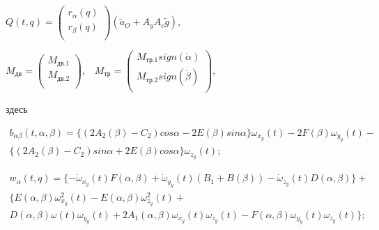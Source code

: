 \(
Q(t,q)=
\left( 
\begin{matrix}
r_{\alpha} (q) \\
r_{\beta} (q) \\
\end{matrix}
\right)
(\tilde{a}_O + A_y A_c \tilde{g})
\),

\( M_{\textit{дв}}= \left( \begin{matrix}
M_{\textit{дв.1}}\\
M_{\textit{дв.2}}\\
\end{matrix}
\right) \),\ \ \( M_{\textit{тр}}= \left( \begin{matrix}
M_{\textit{тр.1}}sign \left( \dot \alpha \right) \\
M_{\textit{тр.2}}sign \left( \dot \beta \right) \\
\end{matrix}
\right) \), 

здесь 

\begin{equation}
\label{eq:p3:48+1}
\begin{multlined}
b_{ \alpha \beta } \left( t, \alpha, \beta \right) = \lbrace \left( 2A_{2} \left( \beta \right) -C_{2} \right) cos \alpha -2E \left( \beta \right) sin \alpha \rbrace \omega _{x_{y}} \left( t \right) -2F \left( \beta \right) \omega _{y_{y}} \left( t \right) - \\ 
\lbrace \left( 2A_{2} \left( \beta \right) -C_{2} \right) sin \alpha +2E \left( \beta \right) cos \alpha \rbrace \omega _{z_{y}} \left( t \right) ;
\end{multlined}
\end{equation}

\begin{equation}
\label{eq:p3:48+2}
\begin{multlined}
w_{ \alpha } ( t,q ) = 
\lbrace - \dot \omega _{x_{y}} ( t ) F ( \alpha, \beta ) + 
\dot \omega _{y_{y}} ( t ) ( B_{1}+B ( \beta ) ) - 
\dot \omega _{z_{y}} ( t ) D ( \alpha, \beta ) \rbrace +\\
\lbrace E ( \alpha, \beta ) \omega _{x_{y}}^{2} ( t ) -E ( \alpha, \beta ) \omega _{z_{y}}^{2} ( t ) +\\
D ( \alpha, \beta ) \omega ( t ) \omega _{y_{y}} ( t ) +2A_{1} ( \alpha, \beta ) \omega _{x_{y}} ( t ) \omega _{z_{y}} ( t ) -F ( \alpha, \beta ) \omega _{y_{y}} ( t ) \omega _{z_{y}} ( t ) \rbrace ;
\end{multlined}
\end{equation}

